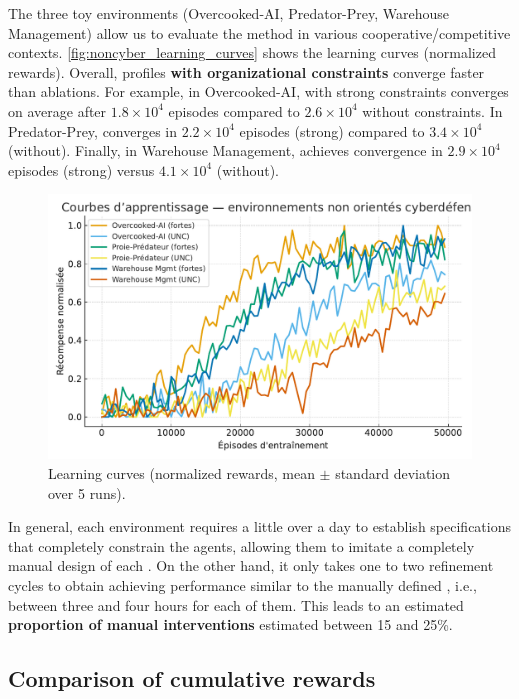 The three toy environments (Overcooked-AI, Predator-Prey, Warehouse Management) allow us to evaluate the  method in various cooperative/competitive contexts.
\autoref{fig:noncyber_learning_curves} shows the learning curves (normalized rewards).
Overall, profiles \textbf{with organizational constraints} converge faster than  ablations.
For example, in Overcooked-AI,  with strong constraints converges on average after $1.8\times 10^4$ episodes compared to $2.6\times 10^4$ without constraints.
In Predator-Prey,  converges in $2.2\times 10^4$ episodes (strong) compared to $3.4\times 10^4$ (without).
Finally, in Warehouse Management,  achieves convergence in $2.9\times 10^4$ episodes (strong) versus $4.1\times 10^4$ (without).

\begin{figure}[h!]
  \centering
  \includegraphics[width=0.75\linewidth]{figures/results_noncyber_learning.pdf}
  \caption{Learning curves (normalized rewards, mean $\pm$ standard deviation over 5 runs).}
  \label{fig:noncyber_learning_curves}
\end{figure}

In general, each environment requires a little over a day to establish specifications that completely constrain the agents, allowing them to imitate a completely manual design of each . On the other hand, it only takes one to two refinement cycles to obtain  achieving performance similar to the manually defined , i.e., between three and four hours for each of them. This leads to an estimated \textbf {proportion of manual interventions} estimated between 15 and 25\%.


\subsection*{Comparison of cumulative rewards}

